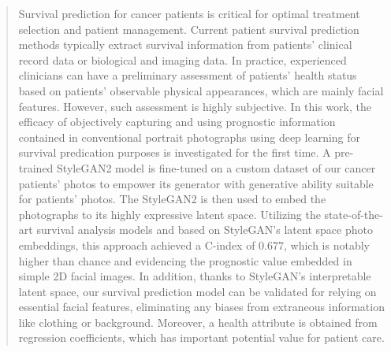 \documentclass[runningheads]{llncs}
\begin{document}
\begin{abstract}
Survival prediction for cancer patients is critical for optimal treatment selection and patient management. Current patient survival prediction methods typically extract survival information from patients' clinical record data or biological and imaging data. In practice, experienced clinicians can have a preliminary assessment of patients' health status based on patients' observable physical appearances, which are mainly facial features. However, such assessment is highly subjective. 
In this work, the efficacy of objectively capturing and using prognostic information contained in conventional portrait photographs using deep learning for survival predication purposes is investigated for the first time.
A pre-trained StyleGAN2 model is fine-tuned on a custom dataset of our cancer patients' photos to empower its generator with generative ability suitable for patients' photos. 
The StyleGAN2 is then used to embed the photographs to its highly expressive latent space.
Utilizing the state-of-the-art survival analysis models and based on StyleGAN's latent space photo embeddings, this approach achieved a C-index of $0.677$, which is notably higher than chance and evidencing the prognostic value embedded in simple 2D facial images. 
In addition, thanks to StyleGAN's interpretable latent space, our survival prediction model can be validated for relying on essential facial features, eliminating any biases from extraneous information like clothing or background. Moreover, a health attribute is obtained from regression coefficients, which has important potential value for patient care.


\end{abstract}
%
%
%
\end{document}
